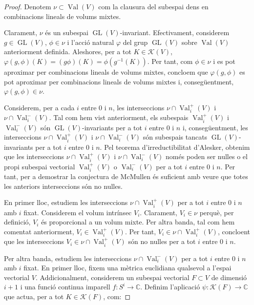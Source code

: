 \documentclass{article}
\theoremstyle{definition}
\DeclareMathOperator{\Val}{Val}
\DeclareMathOperator{\GL}{GL}
\begin{document}
\begin{proof}
Denotem $\nu \subset \Val(V)$ com la clausura del subespai dens en combinacions lineals de volums mixtes. 

Clarament, $\nu$ \'{e}s un subespai $\GL(V)$-invariant. Efectivament, considerem $g \in \GL(V)$, $\phi \in \nu$ i l'acci\'{o} natural $\varphi$ del grup $\GL(V)$ sobre $\Val(V)$ anteriorment definida. Aleshores, per a tot $K \in \mathcal{K}(V)$, $\varphi(g, \phi) (K) = (g \phi) (K) = \phi (g^{-1} (K))$. Per tant, com $\phi \in \nu$ i es pot aproximar per combinacions lineals de volums mixtes, concloem que $\varphi(g, \phi)$ es pot aproximar per combinacions lineals de volums mixtes i, conseg\"{u}entment, $\varphi(g, \phi) \in \nu$.

Considerem, per a cada $i$ entre $0$ i $n$, les interseccions $\nu \cap \Val_i^+(V)$ i $\nu \cap \Val_i^-(V)$. Tal com hem vist anteriorment, els subespais $\Val_i^+(V)$ i $\Val_i^-(V)$ s\'{o}n $\GL(V)$-invariants per a tot $i$ entre $0$ i $n$ i, conseg\"{u}entment, les interseccions $\nu \cap \Val_i^+(V)$ i $\nu \cap \Val_i^-(V)$ s\'{o}n subespais tancats $\GL(V)$-invariants per a tot $i$ entre $0$ i $n$. Pel teorema d'irreductibilitat d'Alesker, obtenim que les interseccions $\nu \cap \Val_i^+(V)$ i $\nu \cap \Val_i^-(V)$ nom\'{e}s poden ser nul\textperiodcentered les o el propi subespai vectorial $\Val_i^+(V)$ o $\Val_i^-(V)$ per a tot $i$ entre $0$ i $n$. Per tant, per a demostrar la conjectura de McMullen \'{e}s suficient amb veure que totes les anteriors interseccions s\'{o}n no nul\textperiodcentered les.

En primer lloc, estudiem les interseccions $\nu \cap \Val_i^+(V)$ per a tot $i$ entre $0$ i $n$ amb $i$ fixat. Considerem el volum intr\'{i}nsec $V_i$. Clarament, $V_i \in \nu$ perqu\`{e}, per definici\'{o}, $V_i$ \'{e}s proporcional a un volum mixte. Per altra banda, tal com hem comentat anteriorment, $V_i \in \Val_i^+(V)$. Per tant, $V_i \in \nu \cap \Val_i^+(V)$, concloent que les interseccions $V_i \in \nu \cap \Val_i^+(V)$ s\'{o}n no nul\textperiodcentered les per a tot $i$ entre $0$ i $n$.

Per altra banda, estudiem les interseccions $\nu \cap \Val_i^-(V)$ per a tot $i$ entre $0$ i $n$ amb $i$ fixat. En primer lloc, fixem una m\`{e}trica euclidiana qualsevol a l'espai vectorial $V$. Addicionalment, considerem un subespai vectorial $F \subset V$ de dimensi\'{o} $i + 1$ i una funci\'{o} continua imparell $f: S^{i} \longrightarrow \mathbb{C}$. Definim l'aplicaci\'{o} $\psi: \mathcal{K}(F) \longrightarrow \mathbb{C}$ que actua, per a tot $K \in \mathcal{K}(F)$, com:


\end{proof}
\end{document}
